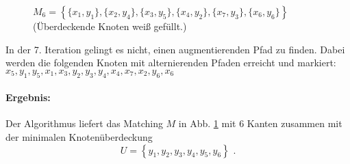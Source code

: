 \documentclass[a4paper]{scrartcl}
\begin{document}
\begin{enumerate}[label=\bfseries\arabic*.]
\begin{enumerate}
\begin{figure}[h]
                    \caption{$M_6 = \left\{ \{x_1, y_1\}, \{x_2, y_4\}, 
                    \{x_3, y_5\}, \{x_4, y_2\}, \{x_7, y_3\}, \{x_6, y_6\}
                    \right\}$ \\ (Überdeckende Knoten weiß gefüllt.)}
                    \label{fig:a-6}
                \end{figure}

                \FloatBarrier

                In der 7. Iteration gelingt es nicht, einen augmentierenden Pfad
                zu finden.
                Dabei werden die folgenden Knoten mit alternierenden Pfaden
                erreicht und markiert:
                $x_5, y_1, y_5, x_1, x_3, y_2, y_3, y_4, x_4, x_7, x_2, y_6, x_6$

                \paragraph{Ergebnis:}
                Der Algorithmus liefert das Matching $M$ in Abb. \ref{fig:a-6}
                mit $6$ Kanten zusammen mit der minimalen Knotenüberdeckung
                \begin{equation}
                    U = \left\{ y_1, y_2, y_3, y_4, y_5, y_6 \right\} \text{ .}
                \end{equation}

            \FloatBarrier


\end{enumerate}
\end{enumerate}
\end{document}
